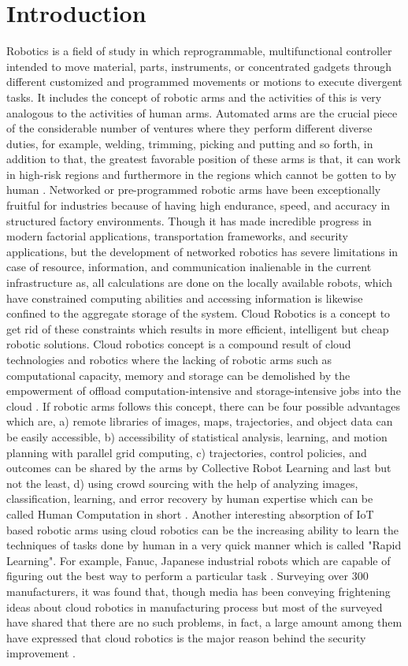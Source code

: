 \documentclass[conference]{IEEEtran}
\begin{document}
\section{Introduction}
Robotics is a field of study in which reprogrammable, multifunctional controller intended to move material, parts, instruments, or concentrated gadgets through different customized and programmed movements or motions to execute divergent tasks. It includes the concept of robotic arms and the activities of this is very analogous to the activities of human arms. Automated arms are the crucial piece of the considerable number of ventures where they perform different diverse duties, for example, welding, trimming, picking and putting and so forth, in addition to that, the greatest favorable position of these arms is that, it can work in high-risk regions and furthermore in the regions which cannot be gotten to by human \cite{one}. Networked or pre-programmed robotic arms have been exceptionally fruitful for industries because of having high endurance, speed, and accuracy in structured factory environments. Though it has made incredible progress in modern factorial applications, transportation frameworks, and security applications, but the development of networked robotics has severe limitations in case of resource, information, and communication inalienable in the current infrastructure as, all calculations are done on the locally available robots, which have constrained computing abilities and accessing information is likewise confined to the aggregate storage of the system. Cloud Robotics is a concept to get rid of these constraints which results in more efficient, intelligent but cheap robotic solutions. \cite{two}
Cloud robotics concept is a compound result of cloud technologies and robotics where the lacking of robotic arms such as computational capacity, memory and storage can be demolished by the empowerment of offload computation-intensive and storage-intensive jobs into the cloud \cite{four}. If robotic arms follows this concept, there can be four possible advantages which are, a) remote libraries of images, maps, trajectories, and object data can be easily accessible, b) accessibility of statistical analysis, learning, and motion planning with parallel grid computing, c) trajectories, control policies, and outcomes can be shared by the arms by Collective Robot Learning and last but not the least, d) using crowd sourcing with the help of analyzing images, classification, learning, and error recovery by human expertise which can be called Human Computation in short \cite{four}. Another interesting absorption of IoT based robotic arms using cloud robotics can be the increasing ability to learn the techniques of tasks done by human in a very quick manner which is called "Rapid Learning". For example, Fanuc, Japanese industrial robots which are capable of figuring out the best way to perform a particular task \cite{five}. Surveying over 300 manufacturers, it was found that, though media has been conveying frightening ideas about cloud robotics in manufacturing process but most of the surveyed have shared that there are no such problems, in fact, a large amount among them have expressed that cloud robotics is the major reason behind the security improvement \cite{six}.
\end{document}
